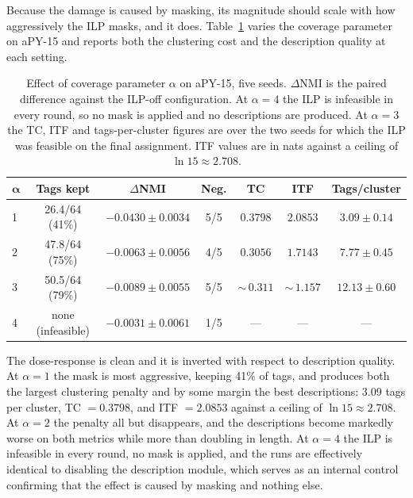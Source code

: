 Because the damage is caused by masking, its magnitude should scale with how aggressively the ILP masks, and it does. Table~\ref{tab:repro_doseresponse} varies the coverage parameter on aPY-15 and reports both the clustering cost and the description quality at each setting.

\begin{table}[H]
    \centering
    \footnotesize
    \caption[Dose-response of the description channel on aPY-15]{Effect of coverage parameter $\alpha$ on aPY-15, five seeds. $\Delta$NMI is the paired difference against the ILP-off configuration. At $\alpha = 4$ the ILP is infeasible in every round, so no mask is applied and no descriptions are produced. At $\alpha = 3$ the TC, ITF and tags-per-cluster figures are over the two seeds for which the ILP was feasible on the final assignment. ITF values are in nats against a ceiling of $\ln 15 \approx 2.708$.}
    \label{tab:repro_doseresponse}
    \begin{tabular}{lcccccc}
        \hline
        $\boldsymbol{\alpha}$ & \textbf{Tags kept} & \textbf{$\Delta$NMI} & \textbf{Neg.} & \textbf{TC} & \textbf{ITF} & \textbf{Tags/cluster} \\
        \hline
        1 & 26.4/64 (41\%) & $\mathbf{-0.0430 \pm 0.0034}$ & 5/5 & $\mathbf{0.3798}$ & $\mathbf{2.0853}$ & $3.09 \pm 0.14$ \\
        2 & 47.8/64 (75\%) & $-0.0063 \pm 0.0056$ & 4/5 & $0.3056$ & $1.7143$ & $7.77 \pm 0.45$ \\
        3 & 50.5/64 (79\%) & $-0.0089 \pm 0.0055$ & 5/5 & ${\sim}\,0.311$ & ${\sim}\,1.157$ & $12.13 \pm 0.60$ \\
        4 & none (infeasible) & $-0.0031 \pm 0.0061$ & 1/5 & --- & --- & --- \\
        \hline
    \end{tabular}
\end{table}


The dose-response is clean and it is inverted with respect to description quality. At $\alpha = 1$ the mask is most aggressive, keeping 41\% of tags, and produces both the largest clustering penalty and by some margin the best descriptions: 3.09 tags per cluster, TC $= 0.3798$, and ITF $= 2.0853$ against a ceiling of $\ln 15 \approx 2.708$. At $\alpha = 2$ the penalty all but disappears, and the descriptions become markedly worse on both metrics while more than doubling in length. At $\alpha = 4$ the ILP is infeasible in every round, no mask is applied, and the runs are effectively identical to disabling the description module, which serves as an internal control confirming that the effect is caused by masking and nothing else.

